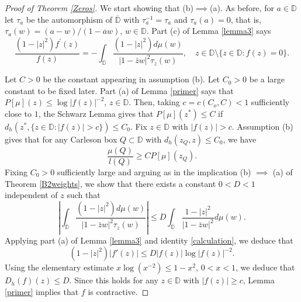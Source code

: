 \documentclass[a4paper,12pt]{article}
\theoremstyle{definition}
\numberwithin{equation}{section}
\newcommand{\D}{\mathbb D}
\begin{document}
\begin{proof}[Proof of Theorem \ref{Zeros}]

We start showing that (b)$\implies$(a). As before, for $a \in \D$ let $\tau_a$ be the automorphism of $ \overline{\D}$ with $\tau_a^{-1} = \tau_a$ and $\tau_a (a) =0$, that is, $\tau_a (w) = (a-w)/ (1- \overline{a}w)$, $w \in \D$. Part (c) of Lemma \ref{lemma3} says 
\begin{equation}
\label{calculation}
\frac{(1- |z|^2) f^{\prime}(z)}{f(z)}= - \int_{\overline{\mathbb{D}}} \frac{\left(1-|z|^{2}\right) d \mu (w)}{|1-\bar{z} w|^{2} \tau_z (w)} , \quad z \in \mathbb{D} \setminus \{z \in \mathbb{D}: f(z) = 0 \} . 
\end{equation}

Let $C >0$ be the constant appearing in assumption (b). Let $C_0>0$ be a large constant to be fixed later. Part (a) of Lemma \ref{primer} says that $P[\mu ] (z) \leq \log |f(z)|^{-2}$, $ z \in \D$. Then, taking $c = c(C_o, C) <1$ sufficiently close to $1$, the Schwarz Lemma gives that $P[\mu] (z^*) \leq C$ if $d_h (z^* , \{z \in \D : |f(z)| >c \}) \leq C_0$. Fix $z \in \D$ with $|f(z)|> c$. Assumption (b) gives that for any Carleson box $Q \subset \D$ with $d_h (z_Q , z) \leq C_0$, we have 
$$
\frac{\mu(Q)}{l(Q)} \geq C P [\mu] (z_Q) .
$$
Fixing $C_0>0$ sufficiently large and arguing as in the implication (b) $\implies$ (a) of Theorem \ref{B2weights}, we show that there exists a constant $0<D<1$ independent of $z$ such that
$$
 \left|\int_{\overline{\mathbb{D}}} \frac{\left(1-|z|^{2}\right) d \mu (w)}{|1-\bar{z} w|^{2} \tau_z (w)} \right| 
 \leq D \int_{\overline{\mathbb{D}}} \frac{1-|z|^{2}}{|1-\bar{z} w|^{2}} d \mu(w)  . 
$$
Applying part (a) of Lemma \ref{lemma3} and identity \eqref{calculation}, we deduce that 
$$
(1-|z|^2) |f' (z)| \leq D |f(z)| \log |f(z)|^{-2}. 
$$
Using the elementary estimate $x \log (x^{-2})  \leq 1-x^{2}$, $0<x<1$, we deduce that $D_h (f) (z) \leq D$. Since this holds for any $z \in \D$ with $|f(z)|\geq c$, Lemma \ref{primer} implies that $f$ is contractive. 



\end{proof}
\end{document}

